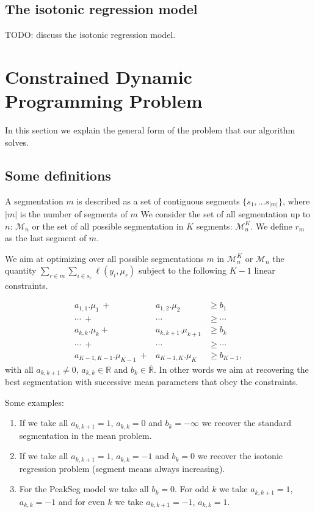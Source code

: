 \documentclass{article}
\begin{document}
\subsection{The isotonic regression model}

TODO: discuss the isotonic regression model.

\newcommand{\FCC}{\widetilde{C}}
\newcommand{\M}{\mathcal{M}}
\section{Constrained Dynamic Programming Problem}
In this section we explain the general form of the problem that our algorithm solves.
\subsection{Some definitions}

A segmentation $m$ is described as a set of contiguous segments $\{s_1, ... s_{|m|} \}$, where $|m|$ is the number of segments of $m$
We consider the set of all segmentation up to $n$: $\M_n$ 
or the set of all possible segmentation in $K$ segments: $\M^K_n$.
We define $r_m$ as the last segment of $m$.

We aim at optimizing over all possible segmentations $m$ in $\M^K_n$ or $\M_n$
 the quantity
$\sum_{r \in m} \sum_{i \in s_{r}} \ell(y_i, \mu_{r})$ subject to
the following $K-1$ linear constraints. 

\begin{eqnarray*}
a_{1,1}.\mu_1 \ + & a_{1,2}.\mu_2  & \geq  b_1 \\
\cdots \ +&  \cdots & \geq \cdots \\
a_{k,k}.\mu_{k} + & a_{k,k+1}.\mu_{k+1}  & \geq  b_{k} \\
\cdots \ +&  \cdots & \geq \cdots  \\
a_{K-1,K-1}.\mu_{K-1} \ +& a_{K-1,K}.\mu_K & \geq  b_{K-1},
\end{eqnarray*}
with all $a_{k,k+1} \neq 0$, $a_{k,k} \in \mathbb{R}$ and
$b_{k} \in \bar{\mathbb{R}}.$ In other words we aim at recovering the
best segmentation with successive mean parameters that obey the
constraints.

Some examples:
\begin{enumerate}
\item If we take all $a_{k,k+1} =1$, $a_{k,k}=0$ and $b_{k} = - \infty$ we recover the standard segmentation in the mean problem.
\item If we take all $a_{k,k+1} =1$, $a_{k,k}=-1$ and $b_{k} = 0$ we
  recover the isotonic regression problem (segment means always
  increasing).
\item For the PeakSeg model we take all $b_{k} = 0$. For odd $k$ we
  take $a_{k,k+1} =1$, $a_{k,k}=-1$ and for even $k$ we take
  $a_{k,k+1} =-1$, $a_{k,k}=1$.
\end{enumerate}
\end{document}
